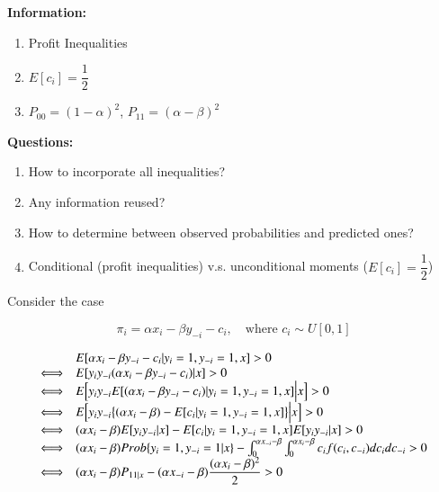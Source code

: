 \documentclass[a4paper]{article}
\begin{document}
{\color{violet}
\textbf{Information:}
\begin{enumerate}
    \item Profit Inequalities
    \item $E[c_i] = \dfrac{1}{2}$
    \item $P_{00} = (1 - \alpha)^2$, $P_{11} = (\alpha - \beta)^2$ 
\end{enumerate}
}

{\color{orange}
\textbf{Questions:}
\begin{enumerate}
    \item How to incorporate all inequalities?
    \item Any information reused?
    \item How to determine between observed probabilities and predicted ones?
    \item Conditional (profit inequalities) v.s. unconditional moments ($E[c_i] = \dfrac{1}{2}$)
\end{enumerate}
}

Consider the case 

$$\pi_i = \alpha x_i - \beta y_{-i} - c_i, \quad \mbox{where } c_i \sim U[0,1]$$

\begin{equation}
    \begin{array}{cl}
    \displaystyle 
    & E[\alpha x_i - \beta y_{-i} - c_i | y_i = 1, y_{-i} = 1, x]  > 0  \\
    \displaystyle \Longleftrightarrow 
    & E[y_iy_{-i}(\alpha x_i - \beta y_{-i} - c_i )|x]  > 0\\
    \displaystyle \Longleftrightarrow 
    & E \Big[y_iy_{-i}E[(\alpha x_i - \beta y_{-i} - c_i )|y_i = 1, y_{-i} = 1, x] \Big|x \Big]  > 0\\
    \displaystyle \Longleftrightarrow 
    & E \Big[y_iy_{-i} \big\{(\alpha x_i - \beta) - E[c_i |y_i = 1, y_{-i} = 1, x] \big\} \Big|x \Big]  > 0\\
    \displaystyle \Longleftrightarrow 
    & (\alpha x_i - \beta)E[y_iy_{-i}|x] - E[c_i |y_i = 1, y_{-i} = 1, x]E[y_iy_{-i}|x]  > 0\\
    \displaystyle \Longleftrightarrow & (\alpha x_i - \beta)Prob\{ y_i = 1, y_{-i} = 1 |x \} - \int_0^{\alpha x_{-i} - \beta}\int_0^{\alpha x_{i} - \beta}c_if(c_i,c_{-i})dc_idc_{-i} > 0 \\
    \displaystyle \Longleftrightarrow 
    & (\alpha x_i - \beta)P_{11|x} - (\alpha x_{-i} - \beta)\dfrac{(\alpha x_{i} - \beta)^2}{2} > 0
    \end{array}
\end{equation}
\end{document}
